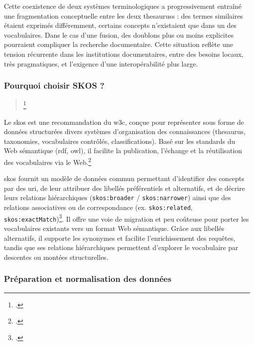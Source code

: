 Cette coexistence de deux systèmes terminologiques a progressivement entraîné une fragmentation conceptuelle entre les deux \glspl{thesaurus} : des termes similaires étaient exprimés différemment, certains concepts n’existaient que dans un des vocabulaires. Dans le cas d'une fusion, des doublons plus ou moins explicites pourraient compliquer la recherche documentaire. Cette situation reflète une tension récurrente dans les institutions documentaires, entre des besoins locaux, très pragmatiques, et l’exigence d’une interopérabilité plus large. 

\subsubsection{Pourquoi choisir SKOS ?}

\begin{quotation}
	\footcite{bermesCasPublierDonnees2013}
\end{quotation}

Le \gls{skos} est une recommandation du \gls{w3c}, conçue pour représenter sous forme de données structurées divers systèmes d’organisation des connaissances (\gls{thesaurus}, \glspl{taxonomie}, vocabulaires contrôlés, classifications). Basé sur les standards du Web sémantique (\gls{rdf}, \gls{owl}), il facilite la publication, l’échange et la réutilisation des vocabulaires via le Web.\footcite{SKOSSimpleKnowledge}

\gls{skos} fournit un modèle de données commun permettant d’identifier des concepts par des \gls{uri}, de leur attribuer des libellés préférentiels et alternatifs, et de décrire leurs relations hiérarchiques (\texttt{skos:broader} / \texttt{skos:narrower}) ainsi que des relations associatives ou de correspondance (ex. \texttt{skos:related}, \texttt{skos:exactMatch})\footcite{bermesCasPublierDonnees2013}. Il offre une voie de migration  et peu coûteuse pour porter les vocabulaires existants vers un format Web sémantique. Grâce aux libellés alternatifs, il supporte les synonymes et facilite l’enrichissement des requêtes, tandis que ses relations hiérarchiques permettent d’explorer le vocabulaire par descentes ou montées structurelles.

\subsubsection{Préparation et normalisation des données}

